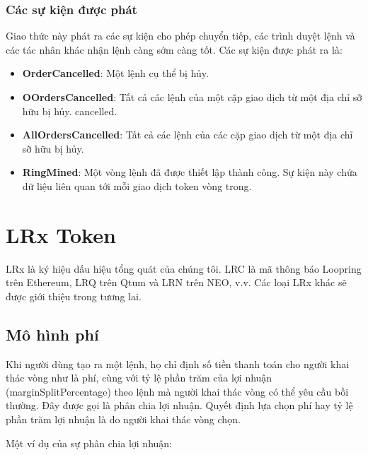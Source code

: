 \documentclass[12pt,a4paper]{article}
\makeatletter
\newenvironment{figurehere}
 {\def\@captype{figure}}
 {}
\makeatother
\begin{document}
\begin{multicols}{2}
\subsubsection{Các sự kiện được phát\label{sec:events}}
Giao thức này phát ra các sự kiện cho phép chuyển tiếp, các trình duyệt lệnh và các tác nhân khác nhận lệnh càng sớm càng tốt. Các sự kiện được phát ra là:
\begin{itemize}
  \item \textbf{OrderCancelled}: Một lệnh cụ thể bị hủy.
  \item \textbf{OOrdersCancelled}: Tất cả các lệnh của một cặp giao dịch từ một địa chỉ sỡ hữu bị hủy.  cancelled.
  \item \textbf{AllOrdersCancelled}: Tất cả các lệnh của các cặp giao dịch từ một địa chỉ sỡ hữu bị hủy.
  \item \textbf{RingMined}: Một vòng lệnh đã được thiết lập thành công. Sự kiện này chứa dữ liệu liên quan tới mỗi  giao dịch token vòng trong.
\end{itemize}

\section{LRx Token\label{sec:token}}
LRx là ký hiệu dấu hiệu tổng quát của chúng tôi. LRC là mã thông báo Loopring trên Ethereum, LRQ trên Qtum và LRN trên NEO, v.v. Các loại LRx khác sẽ được giới thiệu trong tương lai.

\subsection{Mô hình phí\label{sec:fee_model}}
Khi người dùng tạo ra một lệnh, họ chỉ định số tiền thanh toán cho người khai thác vòng như là phí, cùng với tỷ lệ phần trăm của lợi nhuận (marginSplitPercentage) theo lệnh mà người khai thác vòng có thể yêu cầu bồi thường. Đây được gọi là phân chia lợi nhuận. Quyết định lựa chọn phí hay tỷ lệ phần trăm lợi nhuận là do người khai thác vòng chọn.

Một ví dụ của sự phân chia lợi nhuận:
\begin{center}
\begin{figurehere}
\centering
{}
\end{figurehere}
\end{center}
\end{multicols}
\end{document}
